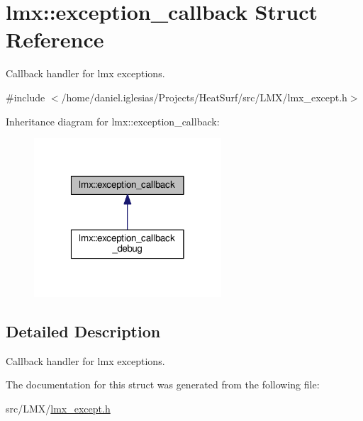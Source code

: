 \hypertarget{structlmx_1_1exception__callback}{\section{lmx\-:\-:exception\-\_\-callback Struct Reference}
\label{structlmx_1_1exception__callback}
}


Callback handler for lmx exceptions.  




{\ttfamily \#include $<$/home/daniel.\-iglesias/\-Projects/\-Heat\-Surf/src/\-L\-M\-X/lmx\-\_\-except.\-h$>$}



Inheritance diagram for lmx\-:\-:exception\-\_\-callback\-:
\nopagebreak
\begin{figure}[H]
\begin{center}
\leavevmode
\includegraphics[width=198pt]{structlmx_1_1exception__callback__inherit__graph}
\end{center}
\end{figure}


\subsection{Detailed Description}
Callback handler for lmx exceptions. 

The documentation for this struct was generated from the following file\-:\begin{DoxyCompactItemize}
\item 
src/\-L\-M\-X/\hyperlink{lmx__except_8h}{lmx\-\_\-except.\-h}\end{DoxyCompactItemize}

